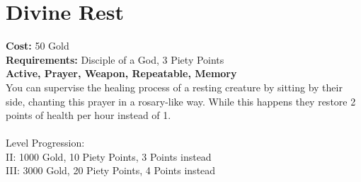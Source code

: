 \section*{Divine Rest}
\textbf{Cost:} 50 Gold\\
\textbf{Requirements:} Disciple of a God, 3 Piety Points \\
\textbf{Active, Prayer, Weapon, Repeatable, Memory}\\
You can supervise the healing process of a resting creature by sitting by their side, chanting this prayer in a rosary-like way. While this happens they restore 2 points of health per hour instead of 1.\\
\\
Level Progression:\\
II: 1000 Gold, 10 Piety Points, 3 Points instead\\
III: 3000 Gold, 20 Piety Points, 4 Points instead\\